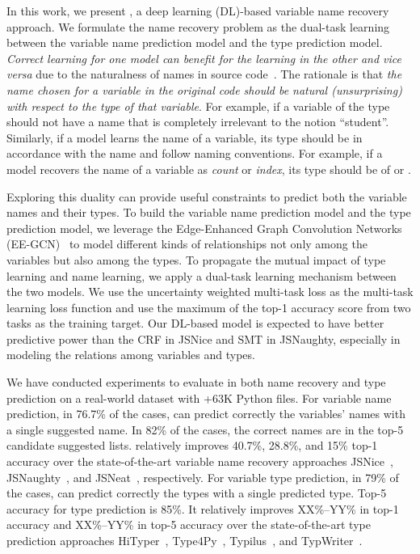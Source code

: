 


In this work, we present {\tool}, a deep learning (DL)-based variable
name recovery approach. We formulate the name recovery problem as the
dual-task learning between the variable name prediction model and the
type prediction model. {\em Correct learning for one model can benefit
  for the learning in the other and vice versa} due to the naturalness
of names in source code~\cite{hindle-icse12}. The rationale is that
{\em the name chosen for a variable in the original code should be
  natural (unsurprising) with respect to the type of that
  variable}. For example, if a variable of the type 
should not have a name that is completely irrelevant to the notion
``student''. Similarly, if a model learns the name of a variable, its
type should be in accordance with the name and follow naming
conventions. For example, if a model recovers the name of a variable
as {\em count} or {\em index}, its type should be of  or
.

Exploring this duality can provide useful constraints to predict both
the variable names and their types.  To build the variable name
prediction model and the type prediction model, we leverage the
Edge-Enhanced Graph Convolution Networks (EE-GCN)~\cite{ee-gcn} to
model different kinds of relationships not only among the variables
but also among the types. To propagate the mutual impact of type
learning and name learning, we apply a dual-task learning mechanism
between the two models. We use the uncertainty weighted multi-task
loss as the multi-task learning loss function and use the maximum of
the top-1 accuracy score from two tasks as the training target. Our
DL-based model is expected to have better predictive power than the
CRF in JSNice and SMT in JSNaughty, especially in modeling the
relations among variables and types.

We have conducted experiments to evaluate {\tool} in both name
recovery and type prediction on a real-world dataset with +63K Python
files. For variable name prediction, in 76.7\% of the cases, {\tool}
can predict correctly the variables' names with a single suggested
name. In 82\% of the cases, the correct names are in the top-5
candidate suggested lists. {\tool} relatively improves 40.7\%, 28.8\%,
and 15\% top-1 accuracy over the state-of-the-art variable name
recovery approaches JSNice~\cite{JSNice2015},
JSNaughty~\cite{JSNaughty2017}, and JSNeat~\cite{icse19},
respectively. For variable type prediction, in 79\% of the cases,
{\tool} can predict correctly the types with a single predicted type.
Top-5 accuracy for type prediction is 85\%. It relatively improves
XX\%--YY\% in top-1 accuracy and XX\%--YY\% in top-5 accuracy over the
state-of-the-art type prediction approaches HiTyper~\cite{yi},
Type4Py~\cite{yi}, Typilus~\cite{yi}, and TypWriter~\cite{yi}.

